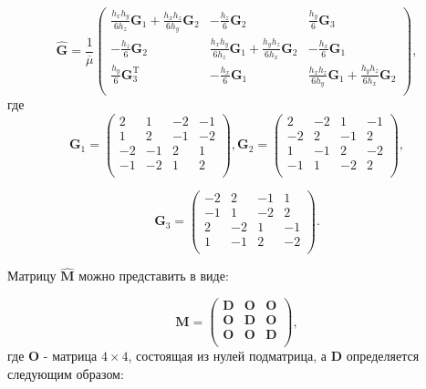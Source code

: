 \begin{equation*}
	\hat{\textbf{G}} = \frac{1}{\overline{\mu}} \left(
	\begin{array}{ccc}
		\frac{h_x h_y}{6h_z}\textbf{G}_1 + \frac{h_x h_z}{6h_y}\textbf{G}_2 & -\frac{h_z}{6}\textbf{G}_2 & \frac{h_y}{6}\textbf{G}_3 \\
		-\frac{h_z}{6}\textbf{G}_2 & \frac{h_x h_y}{6h_z}\textbf{G}_1 + \frac{h_y h_z}{6h_x}\textbf{G}_2 & -\frac{h_x}{6}\textbf{G}_1 \\
		\frac{h_y}{6}\textbf{G}^\text{T}_3 & -\frac{h_x}{6}\textbf{G}_1 & \frac{h_x h_z}{6h_y}\textbf{G}_1 + \frac{h_y h_z}{6h_x}\textbf{G}_2 \\
	\end{array}
	\right),
\end{equation*}
где
\begin{equation*}
	\textbf{G}_1 = \left(
	\begin{array}{rrrr}
		 2 & 1 & -2 & -1 \\
		 1 & 2 & -1 & -2 \\
		 -2 & -1 & 2 & 1 \\
		 -1 & -2 & 1 & 2 \\
	\end{array}
	\right),
	\textbf{G}_2 = \left(
	\begin{array}{rrrr}
		2 & -2 & 1 & -1 \\
		-2 & 2 & -1 & 2 \\
		1 & -1 & 2 & -2 \\
		-1 & 1 & -2 & 2 \\
	\end{array}
	\right),
\end{equation*}

\begin{equation*}
	\textbf{G}_3 = \left(
	\begin{array}{rrrr}
		-2 & 2 & -1 & 1 \\
		-1 & 1 & -2 & 2 \\
		2 & -2 & 1 & -1 \\
		1 & -1 & 2 & -2 \\
	\end{array}
	\right).
\end{equation*}

Матрицу $\hat{\textbf{M}}$ можно представить в виде:

\begin{equation*}
	\textbf{M} = \left(
	\begin{array}{ccc}
		\textbf{D} & \textbf{O} & \textbf{O}\\
		\textbf{O} & \textbf{D} & \textbf{O}\\
		\textbf{O} & \textbf{O} & \textbf{D} \\
	\end{array}
	\right),
\end{equation*}
где $\textbf{O}$ - матрица $4 \times 4$, состоящая из нулей подматрица, а $\textbf{D}$ определяется следующим образом:

